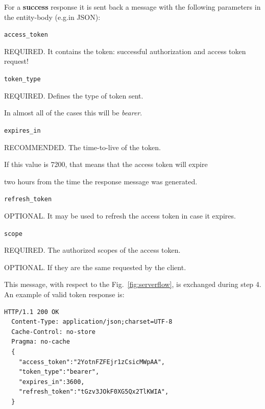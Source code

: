 For a \textbf{success} response it is sent back a message with the following parameters in the entity-body (e.g.in JSON):

\texttt{access\_token}

\hspace{0.5cm}REQUIRED. It contains the token: successful authorization and access token request! 

\texttt{token\_type}

\hspace{0.5cm}REQUIRED. Defines the type of token sent.

\hspace{0.5cm}In almost all of the cases this will be \textit{bearer}.

\texttt{expires\_in}

\hspace{0.5cm}RECOMMENDED. The time-to-live of the token.

\hspace{0.5cm}If this value is 7200, that means that the access token will expire

\hspace{0.5cm}two hours from the time the response message was generated.

\vspace{0.5cm}

\texttt{refresh\_token}

\hspace{0.5cm}OPTIONAL. It may be used to refresh the access token in case it expires.

\texttt{scope}

\hspace{0.5cm}REQUIRED. The authorized scopes of the access token.

\hspace{0.5cm}OPTIONAL. If they are the same requested by the client.

\vspace{0.5cm}

\noindent This message, with respect to the Fig.~\ref{fig:serverflow}, is exchanged during step 4. An example of valid token response is:


\begin{lstlisting}[basicstyle=\ttfamily]
  HTTP/1.1 200 OK
  Content-Type: application/json;charset=UTF-8
  Cache-Control: no-store
  Pragma: no-cache
  {
    "access_token":"2YotnFZFEjr1zCsicMWpAA",
    "token_type":"bearer",
    "expires_in":3600,
    "refresh_token":"tGzv3JOkF0XG5Qx2TlKWIA",
  }
\end{lstlisting}

